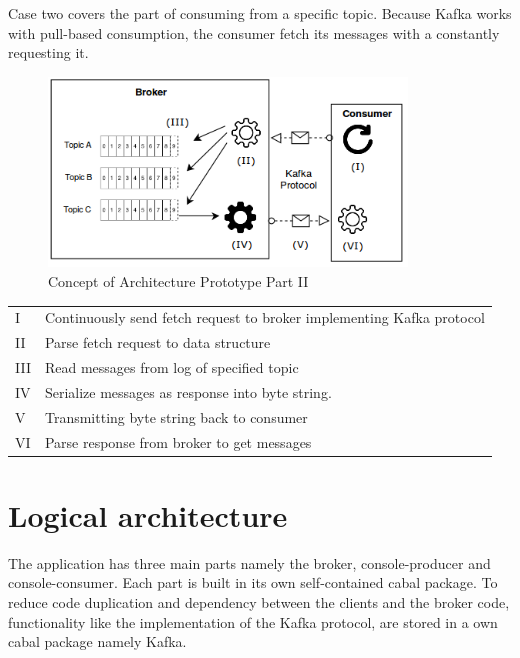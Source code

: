 Case two covers the part of consuming from a specific topic. Because Kafka works with 
pull-based consumption, the consumer fetch its messages with a constantly requesting it. 

\begin{figure}[H]
    \centering
   \includegraphics[width=0.85\textwidth]{images/concept_consumer.png}
    \caption{Concept of Architecture Prototype Part II}
    \label{fig:concept-consumer}
\end{figure}

\begin{table}[h]
\begin{tabular}{ll}
I   & Continuously send fetch request to broker implementing Kafka protocol \\
II  & Parse fetch request to data structure                                 \\
III & Read messages from log of specified topic                             \\
IV  & Serialize messages as response into byte string.                      \\
V   & Transmitting byte string back to consumer                             \\
VI  & Parse response from broker to get messages                           
\end{tabular}
\end{table}

\section{Logical architecture}
The application has three main parts namely the broker, console-producer and console-consumer.
Each part is built in its own self-contained cabal package. To reduce code duplication and 
dependency between the clients and the broker code, functionality like the 
implementation of the Kafka protocol, are stored in a own cabal package namely Kafka. 

